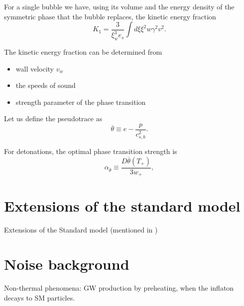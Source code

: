 For a single bubble we have, using its volume and the energy density of the symmetric phase that the bubble replaces, the kinetic energy fraction
\cites[eq. 7.37]{lecture_notes}[eq. 5]{giese_2020}
\begin{equation}
K_1 = \frac{3}{\xi_w^3 e_s} \int d\xi \xi^2 w \gamma^2 v^2.
\end{equation}

The kinetic energy fraction can be determined from
\begin{itemize}
\item wall velocity $v_w$
\item the speeds of sound
\item strength parameter of the phase transition
\end{itemize}

Let us define the pseudotrace as
\cites[eq. 34]{giese_2020}[eq. 1]{giese_2021}
\begin{equation}
\overline{\theta} \equiv e - \frac{p}{c_{s,b}^2}.
\end{equation}

For detonations, the optimal phase transition strength is
\cites[eq. 34]{giese_2020}[eq. 1]{giese_2021}
\begin{equation}
\alpha_{\overline{\theta}} \equiv \frac{D \overline{\theta}(T_+)}{3w_+},
\end{equation}


\section{Extensions of the standard model}
Extensions of the Standard model \cite{caprini_detecting_2020}
(mentioned in \cite[p. 14]{lecture_notes})

\section{Noise background}
Non-thermal phenomena: GW production by preheating, when the inflaton decays to SM particles.
\cite{lecture_notes}
